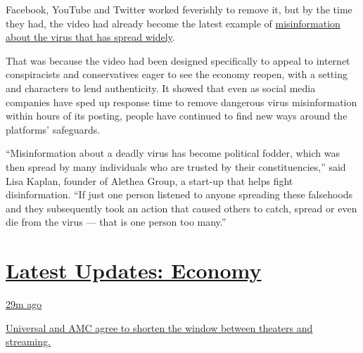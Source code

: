 Facebook, YouTube and Twitter worked feverishly to remove it, but by the
time they had, the video had already become the latest example of
\href{https://web.archive.org/web/20200728210031/https://www.nytimes.com/2020/05/20/technology/plandemic-movie-youtube-facebook-coronavirus.html}{misinformation
about the virus that has spread widely}.

That was because the video had been designed specifically to appeal to
internet conspiracists and conservatives eager to see the economy
reopen, with a setting and characters to lend authenticity. It showed
that even as social media companies have sped up response time to remove
dangerous virus misinformation within hours of its posting, people have
continued to find new ways around the platforms' safeguards.

``Misinformation about a deadly virus has become political fodder, which
was then spread by many individuals who are trusted by their
constituencies,'' said Lisa Kaplan, founder of Alethea Group, a start-up
that helps fight disinformation. ``If just one person listened to anyone
spreading these falsehoods and they subsequently took an action that
caused others to catch, spread or even die from the virus --- that is
one person too many.''

\hypertarget{latest-updates-economy}{%
\section{\texorpdfstring{\href{https://web.archive.org/web/20200728210031/https://www.nytimes.com/live/2020/07/28/business/stock-market-today-coronavirus?action=click\&pgtype=Article\&state=default®ion=MAIN_CONTENT_1\&context=storylines_live_updates}{Latest
Updates:
Economy}}{Latest Updates: Economy}}\label{latest-updates-economy}}

\href{https://web.archive.org/web/20200728210031/https://www.nytimes.com/live/2020/07/28/business/stock-market-today-coronavirus?action=click\&pgtype=Article\&state=default®ion=MAIN_CONTENT_1\&context=storylines_live_updates\#universal-and-amc-agree-to-shorten-the-window-between-theaters-and-streaming}{29m
ago}

\href{https://web.archive.org/web/20200728210031/https://www.nytimes.com/live/2020/07/28/business/stock-market-today-coronavirus?action=click\&pgtype=Article\&state=default®ion=MAIN_CONTENT_1\&context=storylines_live_updates\#universal-and-amc-agree-to-shorten-the-window-between-theaters-and-streaming}{Universal
and AMC agree to shorten the window between theaters and streaming.}

